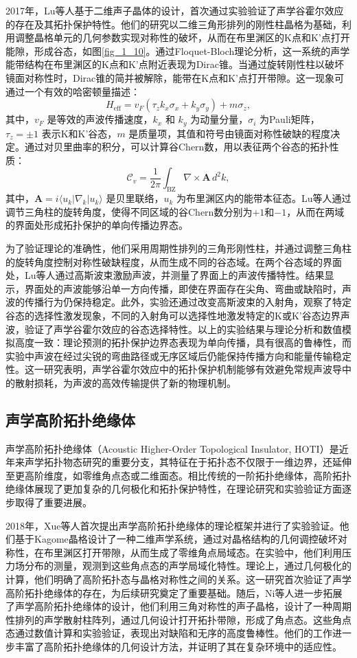 2017年，Lu等人基于二维声子晶体的设计，首次通过实验验证了声学谷霍尔效应的存在及其拓扑保护特性\cite{i3}。他们的研究以二维三角形排列的刚性柱晶格为基础，利用调整晶格单元的几何参数实现对称性的破坏，从而在布里渊区的K点和K'点打开能隙，形成谷态，如图\ref{fig_1_10}。通过Floquet-Bloch理论分析，这一系统的声学能带结构在布里渊区的K点和K'点附近表现为Dirac锥。当通过旋转刚性柱以破坏镜面对称性时，Dirac锥的简并被解除，能带在K点和K'点打开带隙。这一现象可通过一个有效的哈密顿量描述：
\[
H_{\text{eff}} = v_F (\tau_z k_x \sigma_x + k_y \sigma_y) + m \sigma_z,
\]
其中，\(v_F\) 是等效的声波传播速度，\(k_x\) 和 \(k_y\) 为动量分量，\(\sigma_i\) 为Pauli矩阵，\(\tau_z = \pm 1\) 表示K和K'谷态，\(m\) 是质量项，其值和符号由镜面对称性破缺的程度决定。通过对贝里曲率的积分，可以计算谷Chern数，用以表征两个谷态的拓扑性质：
\[
\mathcal{C}_v = \frac{1}{2\pi} \int_{\text{BZ}} \nabla \times \mathbf{A} \, d^2k,
\]
其中，\(\mathbf{A} = i \langle u_k | \nabla_k | u_k \rangle\) 是贝里联络，\(u_k\) 为布里渊区内的能带本征态。Lu等人通过调节三角柱的旋转角度，使得不同区域的谷Chern数分别为\(+1\)和\(-1\)，从而在两域的界面处形成拓扑保护的单向传播边界态。

为了验证理论的准确性，他们采用周期性排列的三角形刚性柱，并通过调整三角柱的旋转角度控制对称性破缺程度，从而生成不同的谷态域。在两个谷态域的界面处，Lu等人通过高斯波束激励声波，并测量了界面上的声波传播特性。结果显示，界面处的声波能够沿单一方向传播，即使在界面存在尖角、弯曲或缺陷时，声波的传播行为仍保持稳定。此外，实验还通过改变高斯波束的入射角，观察了特定谷态的选择性激发现象，不同的入射角可以选择性地激发特定的K或K'谷态边界声波，验证了声学谷霍尔效应的谷态选择特性。以上的实验结果与理论分析和数值模拟高度一致：理论预测的拓扑保护边界态表现为单向传播，具有很高的鲁棒性，而实验中声波在经过尖锐的弯曲路径或无序区域后仍能保持传播方向和能量传输稳定性。这一研究表明，声学谷霍尔效应中的拓扑保护机制能够有效避免常规声波导中的散射损耗，为声波的高效传输提供了新的物理机制。

\subsection{声学高阶拓扑绝缘体}

声学高阶拓扑绝缘体（Acoustic Higher-Order Topological Insulator, HOTI）是近年来声学拓扑物态研究的重要分支，其特征在于拓扑态不仅限于一维边界，还延伸至更高阶维度，如零维角点态或二维面态。相比传统的一阶拓扑绝缘体，高阶拓扑绝缘体展现了更加复杂的几何极化和拓扑保护特性，在理论研究和实验验证方面逐步取得了重要进展。

2018年，Xue等人首次提出声学高阶拓扑绝缘体的理论框架并进行了实验验证\cite{i4}。他们基于Kagome晶格设计了一种二维声学系统，通过对晶格结构的几何调控破坏对称性，在布里渊区打开带隙，从而生成了零维角点局域态。在实验中，他们利用压力场分布的测量，观测到这些角点态的声学局域化特性。理论上，通过几何极化的计算，他们明确了高阶拓扑态与晶格对称性之间的关系。这一研究首次验证了声学高阶拓扑绝缘体的存在，为后续研究奠定了重要基础。随后，Ni等人进一步拓展了声学高阶拓扑绝缘体的设计\cite{i5}，他们利用三角对称性的声子晶格，设计了一种周期性排列的声学散射柱阵列，通过几何设计打开拓扑带隙，形成了角点态。这些角点态通过数值计算和实验验证，表现出对缺陷和无序的高度鲁棒性。他们的工作进一步丰富了高阶拓扑绝缘体的几何设计方法，并证明了其在复杂环境中的适应性。

